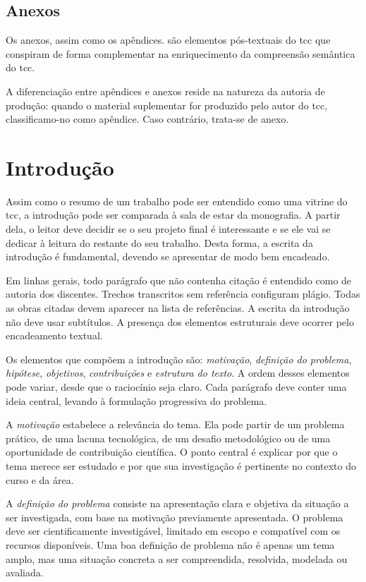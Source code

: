\documentclass{eic-bcc-tcc}
\begin{document}
\section{Anexos}

Os anexos, assim como os apêndices. são elementos pós-textuais do \gls{tcc} que conspiram de forma complementar na enriquecimento da compreensão semântica do \gls{tcc}.

A diferenciação entre apêndices e anexos reside na natureza da autoria de produção: quando o material suplementar for produzido pelo autor do \gls{tcc}, classificamo-no como apêndice. Caso contrário, trata-se de anexo.


\chapter{Introdução}
\label{cha:introducao}

Assim como o resumo de um trabalho pode ser entendido como uma vitrine do \gls{tcc}, a introdução pode ser comparada à sala de estar da monografia. A partir dela, o leitor deve decidir se o seu projeto final é interessante e se ele vai se dedicar à leitura do restante do seu trabalho. Desta forma, a escrita da introdução é fundamental, devendo se apresentar de modo bem encadeado.

Em linhas gerais, todo parágrafo que não contenha citação é entendido como de autoria dos discentes. Trechos transcritos sem referência configuram plágio. Todas as obras citadas devem aparecer na lista de referências. A escrita da introdução não deve usar subtítulos. A presença dos elementos estruturais deve ocorrer pelo encadeamento textual.

Os elementos que compõem a introdução são: \emph{motivação}, \emph{definição do problema}, \emph{hipótese}, \emph{objetivos}, \emph{contribuições} e \emph{estrutura do texto}. A ordem desses elementos pode variar, desde que o raciocínio seja claro. Cada parágrafo deve conter uma ideia central, levando à formulação progressiva do problema.

A \emph{motivação} estabelece a relevância do tema. Ela pode partir de um problema prático, de uma lacuna tecnológica, de um desafio metodológico ou de uma oportunidade de contribuição científica. O ponto central é explicar por que o tema merece ser estudado e por que sua investigação é pertinente no contexto do curso e da área.

A \emph{definição do problema} consiste na apresentação clara e objetiva da situação a ser investigada, com base na motivação previamente apresentada. O problema deve ser cientificamente investigável, limitado em escopo e compatível com os recursos disponíveis. Uma boa definição de problema não é apenas um tema amplo, mas uma situação concreta a ser compreendida, resolvida, modelada ou avaliada.
\end{document}
